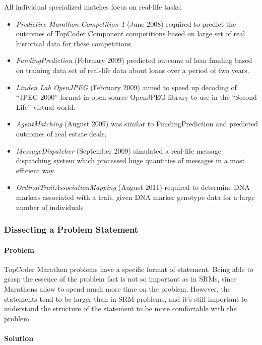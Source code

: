 \documentclass[]{article}
\let\oldparagraph\paragraph
\renewcommand{\paragraph}[1]{\oldparagraph{#1}\mbox{}}
\begin{document}
All individual specialized matches focus on real-life tasks:

\begin{itemize}
\item
  \emph{Predictive Marathon Competition 1} (June 2008) required to
  predict the outcomes of TopCoder Component competitions based on large
  set of real historical data for these competitions.
\item
  \emph{FundingPrediction} (February 2009) predicted outcome of loan
  funding based on training data set of real-life data about loans over
  a period of two years.
\item
  \emph{Linden Lab OpenJPEG} (February 2009) aimed to speed up decoding
  of ``JPEG 2000'' format in open source OpenJPEG library to use in the
  ``Second Life'' virtual world.
\item
  \emph{AgentMatching} (August 2009) was similar to FundingPrediction
  and predicted outcomes of real estate deals.
\item
  \emph{MessageDispatcher }(September 2009) simulated a real-life
  message dispatching system which processed huge quantities of messages
  in a most efficient way.
\item
  \emph{OrdinalTraitAssociationMapping }(August 2011) required to
  determine DNA markers associated with a trait, given DNA marker
  genotype data for a large number of individuals
\end{itemize}

\hypertarget{dissecting-a-problem-statement}{%
\subsubsection{Dissecting a Problem
Statement}\label{dissecting-a-problem-statement}}

\hypertarget{problem-1}{%
\paragraph{Problem}\label{problem-1}}

TopCoder Marathon problems have a specific format of statement. Being
able to grasp the essence of the problem fast is not so important as in
SRMs, since Marathons allow to spend much more time on the problem.
However, the statements tend to be larger than in SRM problems, and it's
still important to understand the structure of the statement to be more
comfortable with the problem.

\hypertarget{solution-1}{%
\paragraph{Solution}\label{solution-1}}
\end{document}
